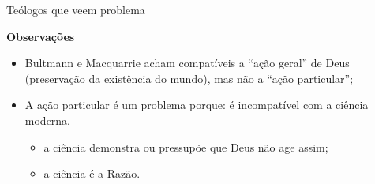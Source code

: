 \begin{frame}{Teólogos que veem problema}
 \centering
 \begin{minipage}{\textwidth}
  \begin{exampleblock}{\textbf{Observações}}
   \begin{itemize}
    \item<2->[$\bullet$] Bultmann e Macquarrie acham compatíveis a ``ação geral'' de
     Deus (preservação da existência do mundo), mas não a ``ação particular'';
    \item<3->[$\bullet$] A ação particular é um problema porque: é incompatível
     com a ciência moderna.
     \begin{itemize}
      \item<4-> a ciência \textcolor{NordYellow}{demonstra} ou 
       \textcolor{NordYellow}{pressupõe} que Deus não age assim;
      \item<5-> a ciência é a Razão.
     \end{itemize}
   \end{itemize}
  \end{exampleblock} 
 \end{minipage}
\end{frame}

